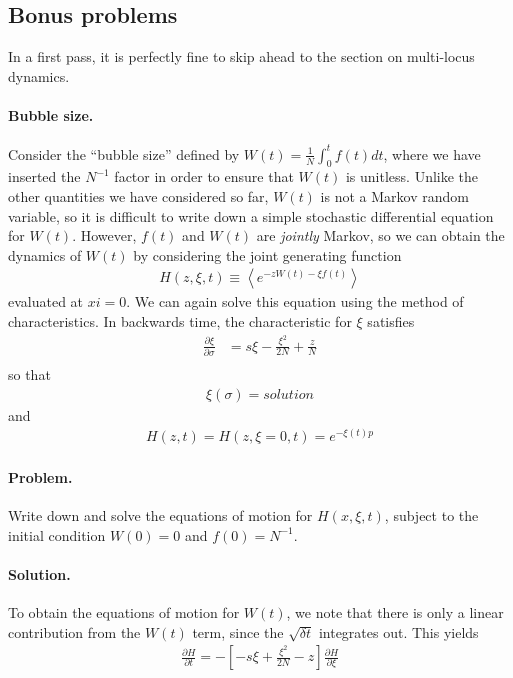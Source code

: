 \documentclass[11pt]{article}
\begin{document}
\subsection*{Bonus problems}

In a first pass, it is perfectly fine to skip ahead to the section on multi-locus dynamics. 

\paragraph{Bubble size.} Consider the ``bubble size'' defined by $W(t) = \frac{1}{N} \int_0^t f(t) dt$, where we have inserted the $N^{-1}$ factor in order to ensure that $W(t)$ is unitless. Unlike the other quantities we have considered so far, $W(t)$ is not a Markov random variable, so it is difficult to write down a simple stochastic differential equation for $W(t)$. However, $f(t)$ and $W(t)$ are \emph{jointly} Markov, so we can obtain the dynamics of $W(t)$ by considering the joint generating function
\begin{align}
H(z,\xi,t) \equiv \left\langle e^{-z W(t) - \xi f(t)} \right\rangle
\end{align}
evaluated at $xi=0$. We can again solve this equation using the method of characteristics. In backwards time, the characteristic for $\xi$ satisfies
\begin{align}
\frac{\partial \xi}{\partial \sigma} & = s \xi - \frac{\xi^2}{2N} + \frac{z}{N} \\
\end{align} 
so that 
\begin{align}
\xi(\sigma) = solution
\end{align}
and
\begin{align}
H(z,t) = H(z,\xi=0,t) = e^{-\xi(t) p} 
\end{align}


\paragraph{Problem.} Write down and solve the equations of motion for $H(x,\xi,t)$, subject to the initial condition $W(0)=0$ and $f(0)=N^{-1}$. 

\paragraph{Solution.} To obtain the equations of motion for $W(t)$, we note that there is only a linear contribution from the $W(t)$ term, since the $\sqrt{\delta t}$ integrates out. This yields
\begin{align}
\frac{\partial H}{\partial t} = - \left[ - s \xi + \frac{\xi^2}{2N} - z \right] \frac{\partial H}{\partial \xi}  
\end{align}   
\end{document}
